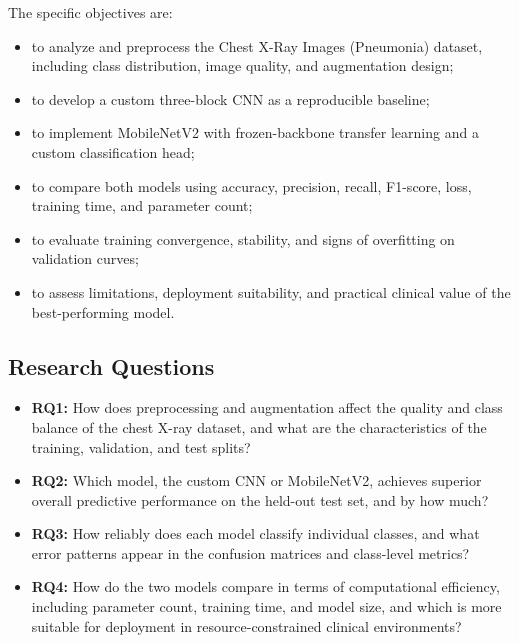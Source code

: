 \documentclass[preprint,12pt]{elsarticle}
\begin{document}
The specific objectives are:
\begin{itemize}
  \item to analyze and preprocess the Chest X-Ray Images (Pneumonia)
        dataset, including class distribution, image quality, and
        augmentation design;
  \item to develop a custom three-block CNN as a reproducible baseline;
  \item to implement MobileNetV2 with frozen-backbone transfer learning
        and a custom classification head;
  \item to compare both models using accuracy, precision, recall,
        F1-score, loss, training time, and parameter count;
  \item to evaluate training convergence, stability, and signs of
        overfitting on validation curves;
  \item to assess limitations, deployment suitability, and practical
        clinical value of the best-performing model.
\end{itemize}

\subsection{Research Questions}
\begin{itemize}
  \item \textbf{RQ1:} How does preprocessing and augmentation affect
        the quality and class balance of the chest X-ray dataset, and
        what are the characteristics of the training, validation, and
        test splits?
  \item \textbf{RQ2:} Which model, the custom CNN or MobileNetV2,
        achieves superior overall predictive performance on the held-out
        test set, and by how much?
  \item \textbf{RQ3:} How reliably does each model classify individual
        classes, and what error patterns appear in the confusion
        matrices and class-level metrics?
  \item \textbf{RQ4:} How do the two models compare in terms of
        computational efficiency, including parameter count, training
        time, and model size, and which is more suitable for deployment
        in resource-constrained clinical environments?
\end{itemize}
\end{document}
